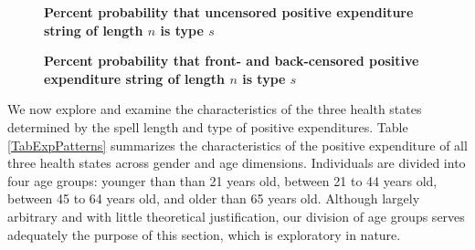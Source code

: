 \documentclass[letterpaper,12pt]{article}
\theoremstyle{definition}
\begin{document}
\begin{spacing}{1.5}{}
  \begin{figure}[ht!]\centering \captionsetup{width=5.0in}
    \caption{\label{Fig_uncensored}\textbf{Percent probability that uncensored positive expenditure string of length $n$ is type $s$}}
  \end{figure}
  \begin{figure}[ht!]\centering \captionsetup{width=5.0in}
    \caption{\label{Fig_2censored}\textbf{Percent probability that front- and back-censored positive expenditure string of length $n$ is type $s$}}
  \end{figure}
  
  We now explore and examine the characteristics of the three health states determined by the spell length and type of positive expenditures. Table \ref{TabExpPatterns} summarizes the characteristics of the positive expenditure of all three health states across gender and age dimensions. Individuals are divided into four age groups: younger than than 21 years old, between 21 to 44 years old, between 45 to 64 years old, and older than 65 years old. Although largely arbitrary and with little theoretical justification, our division of age groups serves adequately the purpose of this section, which is exploratory in nature. 


\end{spacing}
\end{document}
